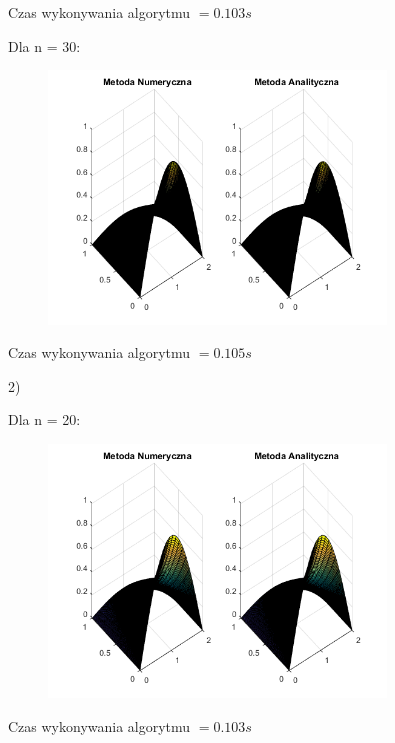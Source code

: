 Czas wykonywania algorytmu $ = 0.103 s$

\newpage

Dla n = 30:

\begin{figure}[!ht]
	\begin{center}
		\includegraphics[width=0.8\textwidth]{Lab7/charts/rm/30.png}
	\end{center}
\end{figure}

Czas wykonywania algorytmu $ = 0.105 s$

2)

Dla n = 20:

\begin{figure}[!ht]
	\begin{center}
		\includegraphics[width=0.8\textwidth]{Lab7/charts/rmb/20.png}
	\end{center}
\end{figure}

Czas wykonywania algorytmu $ = 0.103s$

